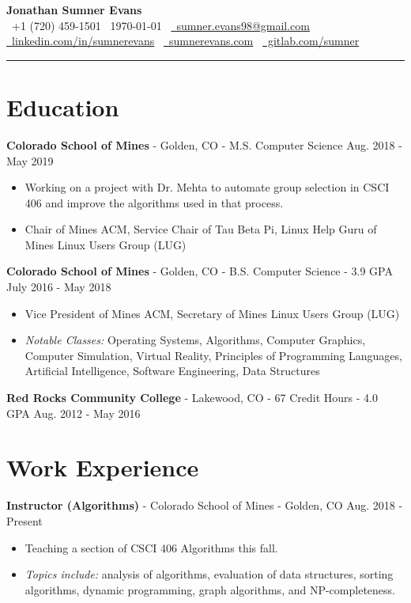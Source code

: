\documentclass[10pt,letterpaper]{article}
\begin{document}
\begin{center}
    {\huge\textbf{Jonathan Sumner Evans}} \\
    \vspace{3pt}
    \faPhone\ +1 (720) 459-1501
    \textbar\ \today
    \textbar\ \href{mailto:sumner.evans98@gmail.com}{\faEnvelope\ sumner.evans98@gmail.com} \\
    \href{https://www.linkedin.com/in/sumnerevans}{\faLinkedin\ linkedin.com/in/sumnerevans}
    \textbar\ \href{https://sumnerevans.com}{\faGlobe\ sumnerevans.com}
    \textbar\ \href{https://gitlab.com/sumner}{\faGitlab\ gitlab.com/sumner}
    \rule{\textwidth}{0.5pt}
\end{center}

\section*{Education}
\textbf{Colorado School of Mines} - Golden, CO - M.S. Computer Science
\hfill Aug. 2018 - May 2019
\begin{itemize}
    \item Working on a project with Dr. Mehta to automate group selection in
        CSCI 406 and improve the algorithms used in that process.
    \item Chair of Mines ACM, Service Chair of Tau Beta Pi, Linux Help Guru of
        Mines Linux Users Group (LUG)
\end{itemize}

\textbf{Colorado School of Mines} - Golden, CO - B.S. Computer Science - 3.9 GPA
\hfill July 2016 - May 2018
\begin{itemize}
    \item Vice President of Mines ACM, Secretary of Mines Linux Users Group
        (LUG)
    \item \textit{Notable Classes:} Operating Systems, Algorithms, Computer
        Graphics, Computer Simulation, Virtual Reality, Principles of
        Programming Languages, Artificial Intelligence, Software Engineering,
        Data Structures
\end{itemize}

\vspace{2pt}
\textbf{Red Rocks Community College} - Lakewood, CO - 67 Credit Hours - 4.0 GPA
\hfill Aug. 2012 - May 2016

\section*{Work Experience}
\textbf{Instructor (Algorithms)} - Colorado School of Mines - Golden, CO
\hfill Aug. 2018 - Present
\begin{itemize}
    \item Teaching a section of CSCI 406 Algorithms this fall.
    \item \textit{Topics include:} analysis of algorithms, evaluation of data
        structures, sorting algorithms, dynamic programming, graph algorithms,
        and NP-completeness.
\end{itemize}
\end{document}
